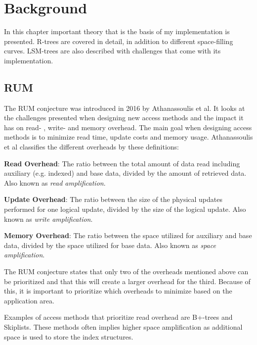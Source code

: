 \chapter{Background}
\label{chap:background}

In this chapter important theory that is the basis of my implementation is presented. R-trees are covered in detail, in addition to different space-filling curves. LSM-trees are also described with challenges that come with its implementation. 

\section{RUM}
The RUM conjecture was introduced in 2016 by Athanassoulis et al\cite{RUM}. It looks at the challenges presented when designing new access methods and the impact it has on read- , write- and memory overhead. The main goal when designing access methods is to minimize read time, update costs and memory usage. Athanassoulis et al classifies the different overheads by these definitions: \newline

\noindent
\textbf{Read Overhead}: The ratio between the total amount of data read including auxiliary (e.g. indexed) and base data, divided by the amount of retrieved data. Also known as \emph{read amplification}.\newline

\noindent
\textbf{Update Overhead}: The ratio between the size of the physical updates performed for one logical update, divided by the size of the logical update. Also known as \emph{write amplification}.\newline

\noindent
\textbf{Memory Overhead}: The ratio between the space utilized for auxiliary and base data, divided by the space utilized for base data. Also known as \emph{space amplification}. \newline

\noindent
The RUM conjecture states that only two of the overheads mentioned above can be prioritized and that this will create a larger overhead for the third. Because of this, it is important to prioritize which overheads to minimize based on the application area. \newline

\noindent
Examples of access methods that prioritize read overhead are B+-trees and Skiplists. These methods often implies higher space amplification as additional space is used to store the index structures. \newline

